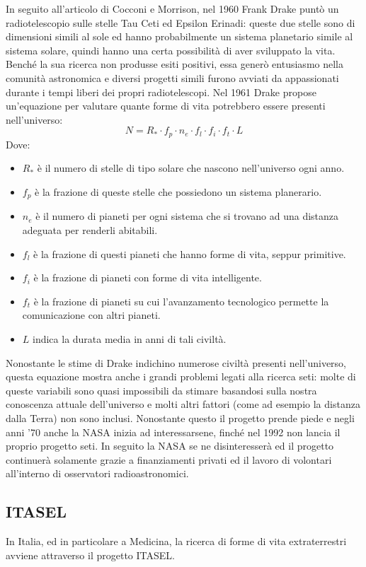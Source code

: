 In seguito all'articolo di Cocconi e Morrison, nel 1960 Frank Drake punt\`o un
radiotelescopio sulle stelle Tau Ceti ed Epsilon Erinadi: queste due stelle sono
di dimensioni simili al sole ed hanno probabilmente un sistema planetario simile
al sistema solare, quindi hanno una certa possibilit\`a di aver sviluppato la
vita. Bench\'e la sua ricerca non produsse esiti positivi, essa gener\`o
entusiasmo nella comunit\`a astronomica e diversi progetti simili furono avviati
da appassionati durante i tempi liberi dei propri radiotelescopi.
Nel 1961 Drake propose un'equazione per valutare quante forme di vita potrebbero
essere presenti nell'universo:
\[
N = R_* \cdot f_p \cdot n_e \cdot f_l \cdot f_i \cdot f_t \cdot L
\]
Dove:
\begin{itemize}
    \item $R_*$ \`e il numero di stelle di tipo solare che nascono nell'universo
    ogni anno.
    \item $f_p$ \`e la frazione di queste stelle che possiedono un sistema
    planerario.
    \item $n_e$ \`e il numero di pianeti per ogni sistema che si trovano ad una
    distanza adeguata per renderli abitabili.
    \item $f_l$ \`e la frazione di questi pianeti che hanno forme di vita,
    seppur primitive.
    \item $f_i$ \`e la frazione di pianeti con forme di vita intelligente.
    \item $f_t$ \`e la frazione di pianeti su cui l'avanzamento tecnologico
    permette la comunicazione con altri pianeti.
    \item $L$ indica la durata media in anni di tali civilt\`a.
\end{itemize}

Nonostante le stime di Drake indichino numerose civilt\`a presenti
nell'universo, questa equazione mostra anche i grandi problemi legati alla
ricerca \ac{seti}: molte di queste variabili sono quasi impossibili da stimare
basandosi sulla nostra conoscenza attuale dell'universo e molti altri fattori
(come ad esempio la distanza dalla Terra) non sono inclusi. Nonostante questo il
progetto prende piede e negli anni '70 anche la NASA inizia ad interessarsene,
finch\'e nel 1992 non lancia il proprio progetto \ac{seti}. In seguito la NASA
se ne disinteresser\`a ed il progetto continuer\`a solamente grazie a
finanziamenti privati ed il lavoro di volontari all'interno di osservatori
radioastronomici.

\subsection*{\ac{ITASEL}}
In Italia, ed in particolare a Medicina, la ricerca di forme di vita
extraterrestri avviene attraverso il progetto \ac{ITASEL}.

